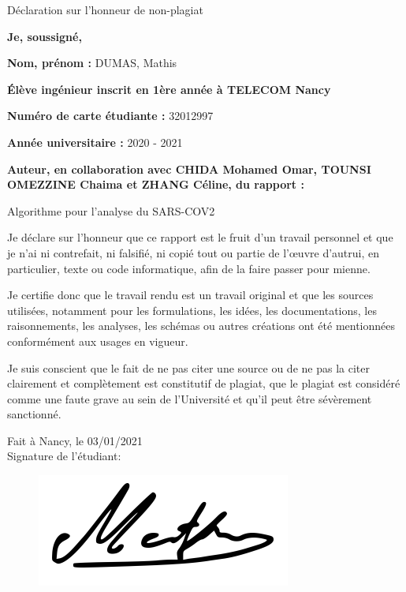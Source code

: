 

%

\begin{center}
\LARGE
    Déclaration sur l'honneur de non-plagiat
\end{center}

\textbf{Je, soussigné,} 

\textbf{Nom, prénom :} DUMAS, Mathis

\textbf{Élève ingénieur inscrit en 1ère année à TELECOM Nancy} 

\textbf{Numéro de carte étudiante :} 32012997 

\textbf{Année universitaire :} 2020 - 2021 

\textbf{Auteur, en collaboration avec CHIDA Mohamed Omar, TOUNSI OMEZZINE Chaima et ZHANG Céline, du rapport : } 

\begin{center}
\Large
    Algorithme pour l'analyse du SARS-COV2 
\end{center}


Je déclare sur l’honneur que ce rapport est le fruit d’un travail personnel et que je n’ai ni contrefait, ni falsifié, ni copié tout ou partie de l’œuvre d’autrui, en particulier, texte ou code informatique, afin de la faire passer pour mienne.

Je certifie donc que le travail rendu est un travail original et que les sources utilisées, notamment pour les formulations, les idées, les documentations, les raisonnements, les analyses, les schémas ou autres créations ont été mentionnées conformément aux usages en vigueur.

Je suis conscient que le fait de ne pas citer une source ou de ne pas la citer clairement et complètement est constitutif de plagiat, que le plagiat est considéré comme une faute grave au sein de l’Université et qu’il peut être sévèrement sanctionné. \\


\begin{flushright}
Fait à Nancy, le 03/01/2021 \\
Signature de l'étudiant:
\end{flushright}
\begin{figure}[!h]
    \begin{flushright}
        \includegraphics[scale=0.6]{Images/Intro/Signatures/mathis.png}
    \end{flushright}
\end{figure}

%